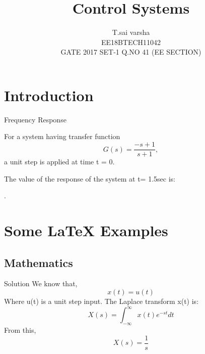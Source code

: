 \documentclass[10pt,xcolor={table,dvipsnames},t]{beamer}
\title[Your Short Title]{Control Systems}
\subtitle{ }
\author{T.sai varsha\\EE18BTECH11042\\GATE 2017 SET-1 Q.NO 41 (EE SECTION)}
\begin{document}
\begin{frame}
  \titlepage
\end{frame}


\section{Introduction}

\begin{frame}{Frequency Response}

\begin{itemize}
 For a system having transfer function 
 \begin{equation}
            G(s)= \frac{-s+1}{s+1} ,
 \end{equation} 
 a unit step is applied at time 
 t = 0.
 \begin{itemsize}
 The value of the response of the system at t= 1.5sec is:
  \end{itemsize}
  

\end{itemize}

\begin{block}{}
.
\end{block}

\end{frame}

\section{Some \LaTeX{} Examples}

\subsection{Mathematics}

\begin{frame}{Solution}
We know that, 
\begin{equation}
     x(t) = u(t) 
\end{equation}
 Where u(t) is a unit step input.
 The Laplace transform x(t) is:
 \begin{equation}
     X(s) =  \int_{-\infty}^{\infty}x(t) e^{-st} dt
 \end{equation}
 From this,
 \begin{equation}
     X(s) =  \frac{1}{s}
 \end{equation}
\end{frame}
\end{document}
